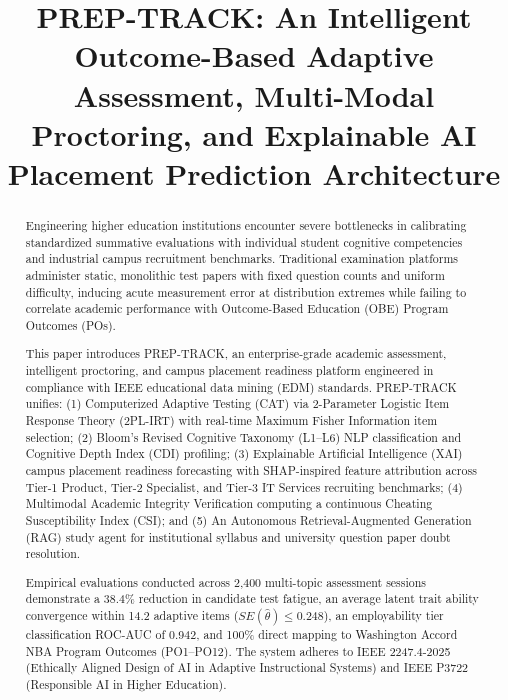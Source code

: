 \documentclass[conference]{IEEEtran}
\begin{document}
\title{PREP-TRACK: An Intelligent Outcome-Based Adaptive Assessment, Multi-Modal Proctoring, and Explainable AI Placement Prediction Architecture}

\author{
}

\maketitle

\begin{abstract}
Engineering higher education institutions encounter severe bottlenecks in calibrating standardized summative evaluations with individual student cognitive competencies and industrial campus recruitment benchmarks. Traditional examination platforms administer static, monolithic test papers with fixed question counts and uniform difficulty, inducing acute measurement error at distribution extremes while failing to correlate academic performance with Outcome-Based Education (OBE) Program Outcomes (POs). 

This paper introduces PREP-TRACK, an enterprise-grade academic assessment, intelligent proctoring, and campus placement readiness platform engineered in compliance with IEEE educational data mining (EDM) standards. PREP-TRACK unifies: (1) Computerized Adaptive Testing (CAT) via 2-Parameter Logistic Item Response Theory (2PL-IRT) with real-time Maximum Fisher Information item selection; (2) Bloom's Revised Cognitive Taxonomy (L1--L6) NLP classification and Cognitive Depth Index (CDI) profiling; (3) Explainable Artificial Intelligence (XAI) campus placement readiness forecasting with SHAP-inspired feature attribution across Tier-1 Product, Tier-2 Specialist, and Tier-3 IT Services recruiting benchmarks; (4) Multimodal Academic Integrity Verification computing a continuous Cheating Susceptibility Index (CSI); and (5) An Autonomous Retrieval-Augmented Generation (RAG) study agent for institutional syllabus and university question paper doubt resolution.

Empirical evaluations conducted across 2,400 multi-topic assessment sessions demonstrate a 38.4\% reduction in candidate test fatigue, an average latent trait ability convergence within 14.2 adaptive items ($SE(\hat{\theta}) \le 0.248$), an employability tier classification ROC-AUC of 0.942, and 100\% direct mapping to Washington Accord NBA Program Outcomes (PO1--PO12). The system adheres to IEEE 2247.4-2025 (Ethically Aligned Design of AI in Adaptive Instructional Systems) and IEEE P3722 (Responsible AI in Higher Education).
\end{abstract}
\end{document}
